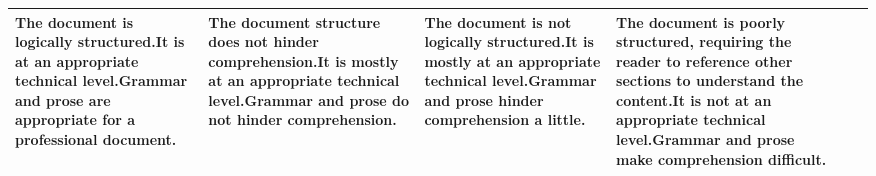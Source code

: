 \documentclass{csse4400}
\begin{document}
\begin{landscape}
\begin{adjustwidth}{-5mm}{-5mm}
\begin{xltabular}{\linewidth}{| p{2cm} | X | X | X | X | X |}
The document is logically structured.\newline\newline It is at an appropriate technical level.\newline\newline Grammar and prose are appropriate for a professional document. &
The document structure does not hinder comprehension.\newline\newline It is mostly at an appropriate technical level.\newline\newline Grammar and prose do not hinder comprehension. &
The document is not logically structured.\newline\newline It is mostly at an appropriate technical level.\newline\newline Grammar and prose hinder comprehension a little. &
The document is poorly structured, requiring the reader to reference other sections to understand the content.\newline\newline It is not at an appropriate technical level.\newline\newline Grammar and prose make comprehension difficult. \\
\hline
\end{xltabular}
\end{adjustwidth}


\end{landscape}
\end{document}
